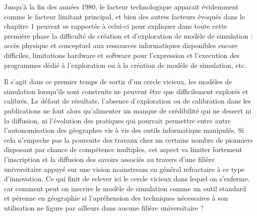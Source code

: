 Jusqu'à la fin des années 1980, le facteur technologique apparait évidemment comme le facteur limitant principal, et bien des autres facteurs évoqués dans le chapitre 1 peuvent se rapportés à celui-ci pour expliquer dans toute cette première phase la difficulté de création et d'exploration de modèle de simulation : accès physique et conceptuel aux ressources informatiques disponibles encore difficiles, limitations hardware et software pour l'expression et l'execution des programmes dédié à l'exploration ou à la création de modèle de simulation, etc.

Il s'agit dans ce premier temps de sortir d'un cercle vicieux, les modèles de simulation lorsqu'ils sont construits ne peuvent être que difficilement explorés et calibrés. Le défaut de résultats, l'absence d'exploration ou de calibration dans les publications ne font alors qu'alimenter un manque de crédibilité qui ne dessert ni la diffusion, ni l'évolution des pratiques qui pourrait permettre entre autre l'autonomisation des géographes vis à vis des outils informatique manipulés. Si cela n'empeche pas la poursuite des travaux chez un certains nombre de pionniers disposant par chance de compétence multiples, cet aspect va limiter fortement l'inscription et la diffusion des savoirs associés au travers d'une filière universitaire appuyé sur une vision mainstream en général refractaire à ce type d'innovation. Ce qui finit de relever ici le cercle vicieux dans lequel on s'enferme, car comment peut on inscrire le modèle de simulation comme un outil standard et pérenne en géographie si l'apréhension des techniques nécessaires à son utilisation ne figure par ailleurs dans aucune filière universitaire ? 




